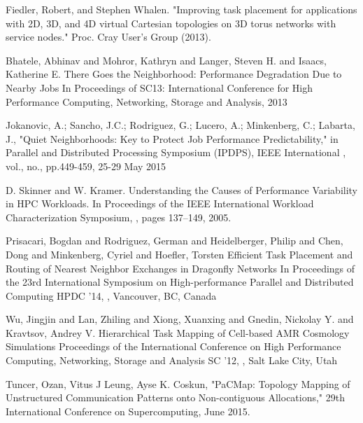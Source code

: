 \documentclass[conference]{IEEEtran}
\begin{document}
\begin{thebibliography}{10}

Fiedler, Robert, and Stephen Whalen. 
\newblock "Improving task placement for applications with 2D, 3D, and 4D virtual Cartesian topologies on 3D torus networks with service nodes." 
\newblock Proc. Cray User’s Group (2013).



Bhatele, Abhinav and Mohror, Kathryn and Langer, Steven
H. and Isaacs, Katherine E. 
\newblock There Goes the Neighborhood: Performance Degradation Due to Nearby Jobs 
\newblock In {Proceedings of SC13: International
Conference for High Performance Computing, Networking, Storage and Analysis},
2013

Jokanovic, A.; Sancho, J.C.; Rodriguez, G.; Lucero, A.; Minkenberg, C.; Labarta, J.,
\newblock "Quiet Neighborhoods: Key to Protect Job Performance Predictability," 
\newblock in Parallel and Distributed Processing Symposium (IPDPS), 
 IEEE International , vol., no., pp.449-459, 25-29 May 2015

D. Skinner and W. Kramer. 
\newblock Understanding the Causes of Performance Variability in HPC Workloads. 
\newblock In Proceedings of the IEEE International Workload Characterization Symposium, 
, pages 137–149, 2005.

Prisacari, Bogdan and Rodriguez, German and Heidelberger, Philip and Chen, Dong and Minkenberg, Cyriel and Hoefler, Torsten
\newblock Efficient Task Placement and Routing of Nearest Neighbor Exchanges in Dragonfly Networks
\newblock In Proceedings of the 23rd International Symposium on High-performance Parallel and Distributed Computing
\newblock HPDC '14,
,
\newblock Vancouver, BC, Canada

Wu, Jingjin and Lan, Zhiling and Xiong, Xuanxing and Gnedin, Nickolay Y. and Kravtsov, Andrey V.
\newblock Hierarchical Task Mapping of Cell-based AMR Cosmology Simulations
\newblock Proceedings of the International Conference on High Performance Computing, Networking, Storage and Analysis
\newblock SC '12,
,
\newblock Salt Lake City, Utah

Tuncer, Ozan, Vitus J Leung, Ayse K. Coskun,
\newblock "PaCMap: Topology Mapping of Unstructured Communication Patterns onto Non-contiguous Allocations," 
\newblock 29th International Conference on Supercomputing, June 2015.



\end{thebibliography}
\end{document}
